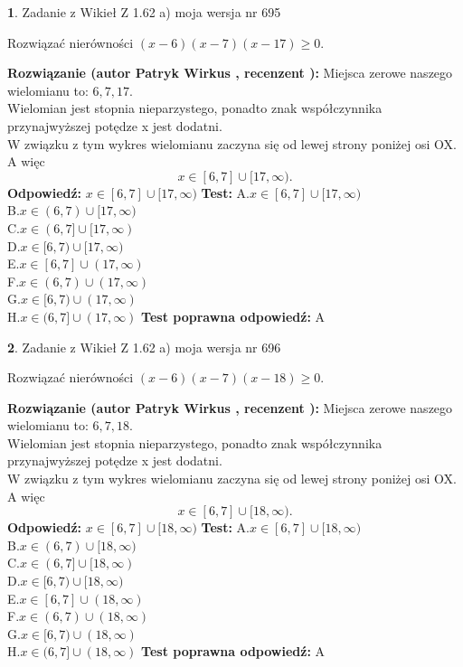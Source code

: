 \documentclass[12pt, a4paper]{article}
\theoremstyle{definition} %
\newtheorem{zad}{}
\newcommand{\zadStart}[1]{\begin{zad}#1\newline}
\newcommand{\zadStop}{\end{zad}}
\newcommand{\rozwStart}[2]{\noindent \textbf{Rozwiązanie (autor #1 , recenzent #2): }\newline}
\newcommand{\rozwStop}{\newline}
\newcommand{\odpStart}{\noindent \textbf{Odpowiedź:}\newline}
\newcommand{\odpStop}{\newline}
\newcommand{\testStart}{\noindent \textbf{Test:}\newline}
\newcommand{\testStop}{\newline}
\newcommand{\kluczStart}{\noindent \textbf{Test poprawna odpowiedź:}\newline}
\newcommand{\kluczStop}{\newline}
\begin{document}
\zadStart{Zadanie z Wikieł Z 1.62 a) moja wersja nr 695}

Rozwiązać nierówności $(x-6)(x-7)(x-17)\ge0$.
\zadStop
\rozwStart{Patryk Wirkus}{}
Miejsca zerowe naszego wielomianu to: $6, 7, 17$.\\
Wielomian jest stopnia nieparzystego, ponadto znak współczynnika przy\linebreak najwyższej potędze x jest dodatni.\\ W związku z tym wykres wielomianu zaczyna się od lewej strony poniżej osi OX. A więc $$x \in [6,7] \cup [17,\infty).$$
\rozwStop
\odpStart
$x \in [6,7] \cup [17,\infty)$
\odpStop
\testStart
A.$x \in [6,7] \cup [17,\infty)$\\
B.$x \in (6,7) \cup [17,\infty)$\\
C.$x \in (6,7] \cup [17,\infty)$\\
D.$x \in [6,7) \cup [17,\infty)$\\
E.$x \in [6,7] \cup (17,\infty)$\\
F.$x \in (6,7) \cup (17,\infty)$\\
G.$x \in [6,7) \cup (17,\infty)$\\
H.$x \in (6,7] \cup (17,\infty)$
\testStop
\kluczStart
A
\kluczStop



\zadStart{Zadanie z Wikieł Z 1.62 a) moja wersja nr 696}

Rozwiązać nierówności $(x-6)(x-7)(x-18)\ge0$.
\zadStop
\rozwStart{Patryk Wirkus}{}
Miejsca zerowe naszego wielomianu to: $6, 7, 18$.\\
Wielomian jest stopnia nieparzystego, ponadto znak współczynnika przy\linebreak najwyższej potędze x jest dodatni.\\ W związku z tym wykres wielomianu zaczyna się od lewej strony poniżej osi OX. A więc $$x \in [6,7] \cup [18,\infty).$$
\rozwStop
\odpStart
$x \in [6,7] \cup [18,\infty)$
\odpStop
\testStart
A.$x \in [6,7] \cup [18,\infty)$\\
B.$x \in (6,7) \cup [18,\infty)$\\
C.$x \in (6,7] \cup [18,\infty)$\\
D.$x \in [6,7) \cup [18,\infty)$\\
E.$x \in [6,7] \cup (18,\infty)$\\
F.$x \in (6,7) \cup (18,\infty)$\\
G.$x \in [6,7) \cup (18,\infty)$\\
H.$x \in (6,7] \cup (18,\infty)$
\testStop
\kluczStart
A
\kluczStop
\end{document}
